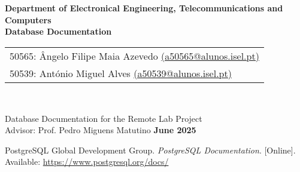 \documentclass[a4paper,twoside,11pt]{report}
\begin{document}
\begin{titlepage}
    \begin{center}
        \begin{minipage}[l]{\textwidth}
            \hspace{-15mm}\\
        \end{minipage}\\[10mm]
        {\large \textbf{Department of Electronical Engineering, Telecommunications and Computers}\\[1.5cm]}
        {\Huge \textbf{Database Documentation}\\[2cm]}    
        {\large \begin{tabular}{l}
        50565: Ângelo Filipe Maia Azevedo \href{mailto:a50565@alunos.isel.pt}{(a50565@alunos.isel.pt)}\\
        50539: António Miguel Alves \href{mailto:a50539@alunos.isel.pt}{(a50539@alunos.isel.pt)}\\
        \end{tabular}\\[3cm] }
        {\large Database Documentation for the Remote Lab Project\\[3cm]}
        {\large Advisor: Prof. Pedro Miguens Matutino}   
        \vfill
        {\large \textbf{June 2025}}   
    \end{center}
\end{titlepage}

\baselineskip 18pt %

\newpage
\thispagestyle{empty}

\cleardoublepage
\tableofcontents 

\cleardoublepage
{}
{}
\listoffigures

\setcounter{page}{1}



\renewcommand{\refname}{\section{Bibliography}}
\begin{thebibliography}{1}
 PostgreSQL Global Development Group. \textit{PostgreSQL Documentation}. [Online]. Available: \url{https://www.postgresql.org/docs/}
\end{thebibliography}
\end{document}
